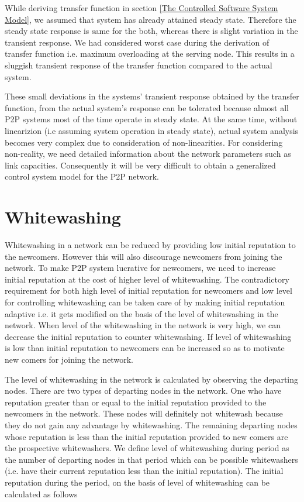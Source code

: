 \documentclass[journal]{IEEEtran}
\begin{document}
While deriving transfer function in section \ref{The Controlled Software System Model}, we assumed that system has already attained steady state. Therefore the steady state response is same for the both, whereas there is slight variation in the transient response. We had considered worst case during the derivation of transfer function i.e. maximum overloading at the serving node. This results in a sluggish transient response of the transfer function compared to the actual system.

These small deviations in the systems' transient response obtained by the transfer function, from the actual system's response can be tolerated because almost all  P2P systems most of the time operate in steady state. At the same time, without linearizion \cite{Ogata} (i.e assuming system operation in steady state), actual system analysis becomes very complex due to consideration of non-linearities. For considering non-reality, we need detailed information about the network parameters such as link capacities. Consequently it will be very difficult to obtain a generalized control system model for the P2P network.  

\section{Whitewashing}
\label{Whitewashing}
Whitewashing in a network can be reduced by providing low initial reputation \cite{Grolimund} to the newcomers. However this will also discourage newcomers from joining the network.  To make P2P system lucrative for newcomers, we need to increase initial reputation at the cost of higher level of whitewashing. The contradictory requirement for both high level of initial reputation for newcomers and low level for controlling whitewashing can be taken care of by making initial reputation adaptive i.e. it gets modified on the basis of the level of whitewashing in the network. When level of the whitewashing in the network is very high, we can decrease the initial reputation to counter whitewashing. If level of whitewashing is low than initial reputation to newcomers can be increased so as to motivate new comers for joining the network. 

The level of whitewashing in the network is calculated by observing the departing nodes. There are two types of departing nodes in the network. One who have reputation greater than or equal to the initial reputation provided to the newcomers in the network. These nodes will definitely not whitewash because they do not gain any advantage by whitewashing. The remaining departing nodes whose reputation is less than the initial reputation provided to new comers are the prospective whitewashers. We define level of whitewashing  during  period as the number of departing nodes in that period which can be possible whitewashers (i.e. have their current reputation less than the initial reputation). 
The initial reputation during the  period, on the basis of level of whitewashing can be calculated as follows
\end{document}
